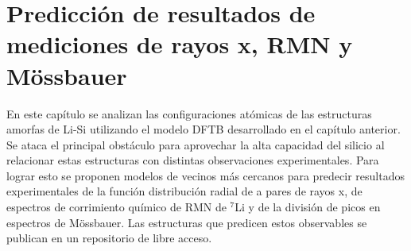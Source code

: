 \chapter{Predicción de resultados de mediciones de rayos x, RMN y Mössbauer}\label{ch:prediccion}
\thispagestyle{empty}

\vspace{50pt}

\begin{adjustwidth}{50pt}{50pt}
    En este capítulo se analizan las configuraciones atómicas de las estructuras
    amorfas de Li-Si utilizando el modelo DFTB desarrollado en el capítulo 
    anterior. Se ataca el principal obstáculo para aprovechar la alta capacidad 
    del silicio al relacionar estas estructuras con distintas observaciones 
    experimentales. Para lograr esto se proponen modelos de vecinos más 
    cercanos para predecir resultados experimentales de la función 
    distribución radial de a pares de rayos x, de espectros de corrimiento 
    químico de RMN de $^7$Li y de la división de picos en espectros de 
    Mössbauer. Las estructuras que predicen estos observables se publican
    en un repositorio de libre acceso.
\end{adjustwidth}

\clearpage
\newpage
\thispagestyle{empty}
\mbox{}
\newpage









